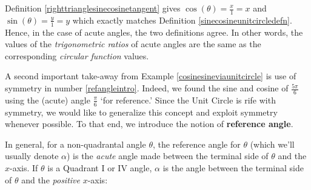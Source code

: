 \documentclass{ximera}
\begin{document}
Definition \ref{righttrianglesinecosinetangent} gives $\cos(\theta) = \frac{x}{1} = x$ and $\sin(\theta) = \frac{y}{1} = y$ which exactly matches Definition \ref{sinecosineunitcircledefn}.  Hence, in the case of acute angles, the two definitions agree. In other words,  the values of the \textit{trigonometric ratios} of acute angles are the same as the corresponding \textit{circular function} values. 


 
A second important take-away from Example \ref{cosinesineviaunitcircle} is use of symmetry in  number \ref{refangleintro}.  Indeed, we found the sine and cosine of $\frac{5\pi}{6}$ using  the (acute) angle $\frac{\pi}{6}$ `for reference.'   Since the Unit Circle is rife with symmetry, we would like to generalize this concept and exploit symmetry whenever possible.  To that end, we introduce the notion of \textbf{reference angle}.



In general, for a non-quadrantal angle $\theta$, the reference angle for $\theta$ (which we'll usually denote $\alpha$) is the \textit{acute} angle made between the terminal side of $\theta$ and the $x$-axis.  If $\theta$ is a Quadrant I or IV angle, $\alpha$ is the angle between the terminal side of $\theta$ and the \textit{positive} $x$-axis:
\end{document}
